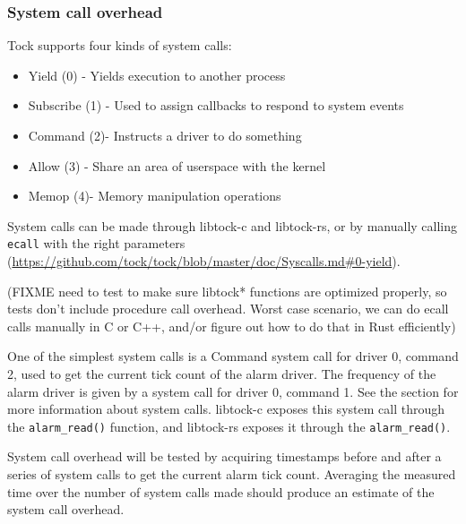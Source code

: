 \documentclass{article}
\begin{document}
\subsubsection{System call overhead} \label{sec:syscalls}

Tock supports four kinds of system calls:
\begin{itemize}
    \item Yield (0) - Yields execution to another process
    \item Subscribe (1) - Used to assign callbacks to respond to system events
    \item Command (2)- Instructs a driver to do something
    \item Allow (3) - Share an area of userspace with the kernel
    \item Memop (4)- Memory manipulation operations
\end{itemize}

System calls can be made through libtock-c and libtock-rs, or by manually calling \texttt{ecall} with the right parameters (\url{https://github.com/tock/tock/blob/master/doc/Syscalls.md#0-yield}).

(FIXME need to test to make sure libtock* functions are optimized properly, so tests don't include procedure call overhead. Worst case scenario, we can do ecall calls manually in C or C++, and/or figure out how to do that in Rust efficiently)

One of the simplest system calls is a Command system call for driver 0, command 2, used to get the current tick count of the alarm driver. The frequency of the alarm driver is given by a system call for driver 0, command 1. See the  section for more information about system calls. libtock-c exposes this system call through the \texttt{alarm\_read()} function, and libtock-rs exposes it through the \texttt{alarm\_read()}.

System call overhead will be tested by acquiring timestamps before and after a series of system calls to get the current alarm tick count. Averaging the measured time over the number of system calls made should produce an estimate of the system call overhead.

\end{document}
